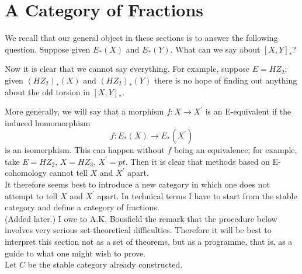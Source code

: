 \documentclass[../main]{subfiles}
\begin{document}

\chapter{A Category of Fractions}
\label{sec:p3c14}
We recall that our general object in these sections is to answer the following question. Suppose given  $E_{\ast}(X)$ and $E_{\ast}(Y)$. What can we say about $\left[ X,Y \right]_{\ast}$?

Now it is clear that we cannot say everything. For example, suppose $E = HZ_{2}$; given $(HZ_{2})_{\ast}(X)$ and $(HZ_{2})_{\ast}(Y)$ there is no hope of finding out anything about the old torsion in $\left[ X,Y \right] _{\ast}$. 

More generally, we will say that a morphism $f\colon X \to X^{\prime} $ is an E-equivalent if the induced homomorphism 
$$
  f\colon E_{\ast}(X) \to E_{\ast}(X^{\prime}) 
$$
is an isomorphism. This can happen without $f$ being an equivalence; for example, take $E = HZ _{2}$, $X = HZ_3$, $X^{\prime}= pt.$ Then it is clear that methods based on E-cohomology cannot tell $X$ and $X^{\prime}$ apart.\\
It therefore seems best to introduce a new category in which one does not attempt to tell $X$ and $X^{\prime}$ apart. In technical terms I have to start from the stable category and define a category of fractions.\\
(Added later.) I owe to A.K. Bousfield the remark that the procedure below involves very serious set-theoretical difficulties. Therefore it will be best to interpret this section not as a set of theorems, but as a programme, that is, as a guide to what one might wish to prove.\\
Let $C$ be the stable category already constructed.
\end{document}
